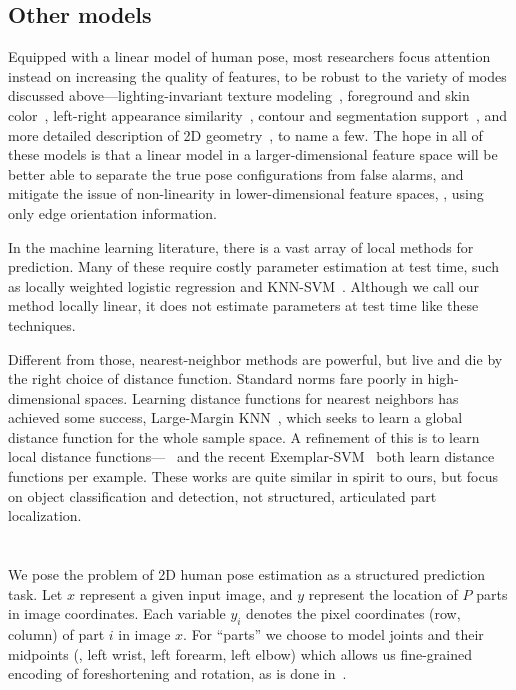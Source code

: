 \subsection{Other models}
 Equipped with a linear model of human 
pose, most researchers focus attention instead on increasing the quality of 
features, to be robust to the variety of modes discussed 
above---lighting-invariant texture modeling~\citep{andriluka09}, foreground and 
skin color~\citep{devacrf,eichner09}, left-right appearance 
similarity~\citep{ddtran,sapp2011}, contour and segmentation 
support~\citep{sapp2010cascades,sapp2011}, and more detailed description of 2D 
geometry~\citep{ddtran,sapp2011}, to name a few.  The hope in all of these 
models is that a linear model in a larger-dimensional feature space will be 
better able to separate the true pose configurations from false alarms, and 
mitigate the issue of non-linearity in lower-dimensional feature spaces, \eg, 
using only edge orientation information.

In the machine learning literature, there is a vast array of local methods for 
prediction.  Many of these require costly parameter estimation at test time, 
such as locally weighted logistic regression and KNN-SVM~\citep{zhang06}.  
Although we call our method locally linear, it does not estimate parameters at 
test time like these techniques.

Different from those, nearest-neighbor methods are powerful, but live and die 
by the right choice of distance function.  Standard norms fare poorly in 
high-dimensional spaces.  Learning distance functions for nearest neighbors has 
achieved some success, \eg Large-Margin KNN~\citep{lmknn}, which seeks to learn 
a global distance function for the whole sample space.  A refinement of this is 
to learn local distance functions---~\citep{frome07} and the recent 
Exemplar-SVM~\citep{esvm} both learn distance functions per example.  These 
works are quite similar in spirit to ours, but focus on object classification 
and detection, not structured, articulated part localization.


\section{\LLPS}\label{sec:llps-model}

We pose the problem of 2D human pose estimation as a structured prediction 
task.  Let $x$ represent a given input image, and $y$ represent the location of 
$P$ parts in image coordinates.  Each variable $y_i$ denotes the pixel 
coordinates (row, column) of part $i$ in image $x$.  For ``parts'' we choose to 
model joints and their midpoints (\eg, left wrist, left forearm, left elbow) 
which allows us fine-grained encoding of foreshortening and rotation, as is 
done in~\citep{deva2011,sapp2011}.

